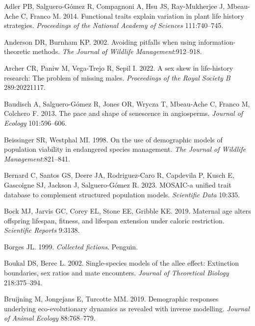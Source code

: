\documentclass[
  12pt,
  letterpaper,
]{book}
\newlength{\cslhangindent}
\newenvironment{CSLReferences}[2] %
 {\begin{list}{}{%
  \setlength{\itemindent}{0pt}
  \setlength{\leftmargin}{0pt}
  \setlength{\parsep}{0pt}
  \ifodd #1
   \setlength{\leftmargin}{\cslhangindent}
   \setlength{\itemindent}{-1\cslhangindent}
  \fi
  \setlength{\itemsep}{#2\baselineskip}}}
 {\end{list}}
\begin{document}
\label{refs}
\begin{CSLReferences}{1}{0}
Adler PB, Salguero-Gómez R, Compagnoni A, Hsu JS, Ray-Mukherjee J,
Mbeau-Ache C, Franco M. 2014. Functional traits explain variation in
plant life history strategies. \emph{Proceedings of the National Academy
of Sciences} 111:740--745.

Anderson DR, Burnham KP. 2002. Avoiding pitfalls when using
information-theoretic methods. \emph{The Journal of Wildlife
Management}:912--918.

Archer CR, Paniw M, Vega-Trejo R, Sepil I. 2022. A sex skew in
life-history research: The problem of missing males. \emph{Proceedings
of the Royal Society B} 289:20221117.

Baudisch A, Salguero-Gómez R, Jones OR, Wrycza T, Mbeau-Ache C, Franco
M, Colchero F. 2013. The pace and shape of senescence in angiosperms.
\emph{Journal of Ecology} 101:596--606.

Beissinger SR, Westphal MI. 1998. On the use of demographic models of
population viability in endangered species management. \emph{The Journal
of Wildlife Management}:821--841.

Bernard C, Santos GS, Deere JA, Rodriguez-Caro R, Capdevila P, Kusch E,
Gascoigne SJ, Jackson J, Salguero-Gómez R. 2023. MOSAIC-a unified trait
database to complement structured population models. \emph{Scientific
Data} 10:335.

Bock MJ, Jarvis GC, Corey EL, Stone EE, Gribble KE. 2019. Maternal age
alters offspring lifespan, fitness, and lifespan extension under caloric
restriction. \emph{Scientific Reports} 9:3138.

Borges JL. 1999. \emph{Collected fictions}. Penguin.

Boukal DS, Berec L. 2002. Single-species models of the allee effect:
Extinction boundaries, sex ratios and mate encounters. \emph{Journal of
Theoretical Biology} 218:375--394.

Bruijning M, Jongejans E, Turcotte MM. 2019. Demographic responses
underlying eco-evolutionary dynamics as revealed with inverse modelling.
\emph{Journal of Animal Ecology} 88:768--779.


\end{CSLReferences}
\end{document}

